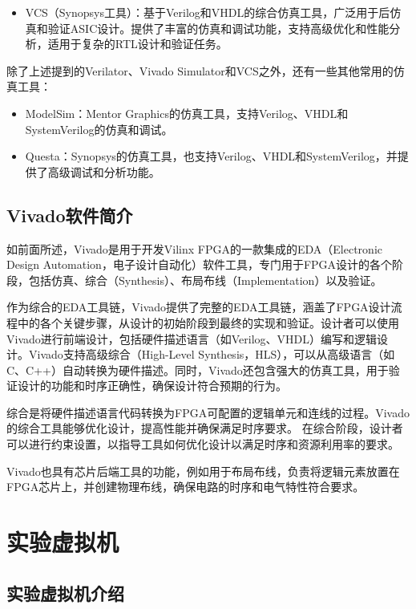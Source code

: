 \begin{itemize}
\tightlist
\item
  VCS（Synopsys工具）：基于Verilog和VHDL的综合仿真工具，广泛用于后仿真和验证ASIC设计。提供了丰富的仿真和调试功能，支持高级优化和性能分析，适用于复杂的RTL设计和验证任务。
\end{itemize}

除了上述提到的Verilator、Vivado Simulator和VCS之外，还有一些其他常用的仿真工具：

\begin{itemize}
\item
  ModelSim：Mentor Graphics的仿真工具，支持Verilog、VHDL和SystemVerilog的仿真和调试。
\item
  Questa：Synopsys的仿真工具，也支持Verilog、VHDL和SystemVerilog，并提供了高级调试和分析功能。
\end{itemize}

\subsection{Vivado软件简介}\label{sec:02-design-environment-008}

如前面所述，Vivado是用于开发Vilinx FPGA的一款集成的EDA（Electronic Design Automation，电子设计自动化）软件工具，专门用于FPGA设计的各个阶段，包括仿真、综合（Synthesis）、布局布线（Implementation）以及验证。

作为综合的EDA工具链，Vivado提供了完整的EDA工具链，涵盖了FPGA设计流程中的各个关键步骤，从设计的初始阶段到最终的实现和验证。设计者可以使用Vivado进行前端设计，包括硬件描述语言（如Verilog、VHDL）编写和逻辑设计。Vivado支持高级综合（High-Level Synthesis，HLS），可以从高级语言（如C、C++）自动转换为硬件描述。同时，Vivado还包含强大的仿真工具，用于验证设计的功能和时序正确性，确保设计符合预期的行为。

综合是将硬件描述语言代码转换为FPGA可配置的逻辑单元和连线的过程。Vivado的综合工具能够优化设计，提高性能并确保满足时序要求。
在综合阶段，设计者可以进行约束设置，以指导工具如何优化设计以满足时序和资源利用率的要求。

Vivado也具有芯片后端工具的功能，例如用于布局布线，负责将逻辑元素放置在FPGA芯片上，并创建物理布线，确保电路的时序和电气特性符合要求。

\section{实验虚拟机}\label{sec:02-design-environment-009}

\subsection{实验虚拟机介绍}\label{sec:02-design-environment-010}

